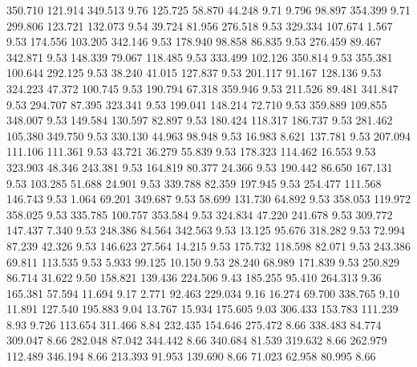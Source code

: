  350.710  121.914  349.513         9.76
 125.725   58.870   44.248         9.71
   9.796   98.897  354.399         9.71
 299.806  123.721  132.073         9.54
  39.724   81.956  276.518         9.53
 329.334  107.674    1.567         9.53
 174.556  103.205  342.146         9.53
 178.940   98.858   86.835         9.53
 276.459   89.467  342.871         9.53
 148.339   79.067  118.485         9.53
 333.499  102.126  350.814         9.53
 355.381  100.644  292.125         9.53
  38.240   41.015  127.837         9.53
 201.117   91.167  128.136         9.53
 324.223   47.372  100.745         9.53
 190.794   67.318  359.946         9.53
 211.526   89.481  341.847         9.53
 294.707   87.395  323.341         9.53
 199.041  148.214   72.710         9.53
 359.889  109.855  348.007         9.53
 149.584  130.597   82.897         9.53
 180.424  118.317  186.737         9.53
 281.462  105.380  349.750         9.53
 330.130   44.963   98.948         9.53
  16.983    8.621  137.781         9.53
 207.094  111.106  111.361         9.53
  43.721   36.279   55.839         9.53
 178.323  114.462   16.553         9.53
 323.903   48.346  243.381         9.53
 164.819   80.377   24.366         9.53
 190.442   86.650  167.131         9.53
 103.285   51.688   24.901         9.53
 339.788   82.359  197.945         9.53
 254.477  111.568  146.743         9.53
   1.064   69.201  349.687         9.53
  58.699  131.730   64.892         9.53
 358.053  119.972  358.025         9.53
 335.785  100.757  353.584         9.53
 324.834   47.220  241.678         9.53
 309.772  147.437    7.340         9.53
 248.386   84.564  342.563         9.53
  13.125   95.676  318.282         9.53
  72.994   87.239   42.326         9.53
 146.623   27.564   14.215         9.53
 175.732  118.598   82.071         9.53
 243.386   69.811  113.535         9.53
   5.933   99.125   10.150         9.53
  28.240   68.989  171.839         9.53
 250.829   86.714   31.622         9.50
 158.821  139.436  224.506         9.43
 185.255   95.410  264.313         9.36
 165.381   57.594   11.694         9.17
   2.771   92.463  229.034         9.16
  16.274   69.700  338.765         9.10
  11.891  127.540  195.883         9.04
  13.767   15.934  175.605         9.03
 306.433  153.783  111.239         8.93
   9.726  113.654  311.466         8.84
 232.435  154.646  275.472         8.66
 338.483   84.774  309.047         8.66
 282.048   87.042  344.442         8.66
 340.684   81.539  319.632         8.66
 262.979  112.489  346.194         8.66
 213.393   91.953  139.690         8.66
  71.023   62.958   80.995         8.66
